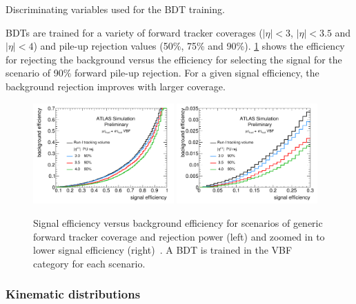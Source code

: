 \begin{table}[bp]
  \centering
  \renewcommand{\arraystretch}{1.4}
  \caption{Discriminating variables used for the BDT training.}
  
  \label{tab:prospects-hllhc-inputs}
\end{table}

BDTs are trained for a variety of forward tracker coverages ($|\eta| < 3$, $|\eta| < 3.5$ and $|\eta| < 4$) and pile-up rejection values (50\%, 75\% and 90\%). \cref{fig:prospects-hllhc-rocs} shows the efficiency for rejecting the background versus the efficiency for selecting the signal for the scenario of 90\% forward pile-up rejection. For a given signal efficiency, the background rejection improves with larger coverage.

\begin{figure}[tp]
  \centering
  \includegraphics[width=0.48\textwidth]{figures/ATL-PHYS-PUB-2014-018/fig_02a}
  \includegraphics[width=0.48\textwidth]{figures/ATL-PHYS-PUB-2014-018/fig_02b}
  \caption{Signal efficiency versus background efficiency for scenarios of generic forward tracker coverage and rejection power (left) and zoomed in to lower signal efficiency (right)~\cite{ATL-PHYS-PUB-2014-018}. A BDT is trained in the VBF category for each scenario.}
  \label{fig:prospects-hllhc-rocs}
\end{figure}

\subsubsection{Kinematic distributions}

